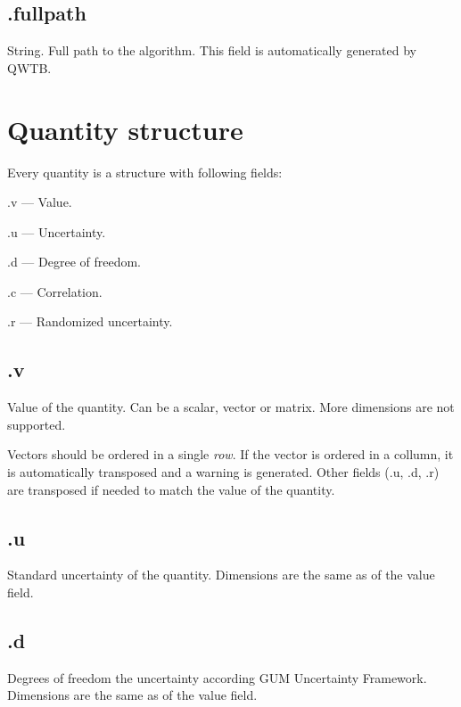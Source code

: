 \documentclass[12pt,a4paper,oneside]{report} %
\begin{document}
\subsection{\textsf{.fullpath}} %
String. Full path to the algorithm. This field is automatically generated by QWTB.

\section{Quantity structure} %
\label{structquantity}
Every quantity is a structure with following fields:
\begin{tightdesc}
        \item [\textsf{.v}] --- Value.
        \item [\textsf{.u}] --- Uncertainty.
        \item [\textsf{.d}] --- Degree of freedom.
        \item [\textsf{.c}] --- Correlation.
        \item [\textsf{.r}] --- Randomized uncertainty.
\end{tightdesc}

\subsection{\textsf{.v}} %
Value of the quantity. Can be a scalar, vector or matrix. More dimensions are not
supported. 

Vectors should be ordered in a single \emph{row}. If the vector is ordered in a collumn,
it is automatically transposed and a warning is generated. Other fields (\textsf{.u},
\textsf{.d}, \textsf{.r}) are transposed if needed to match the value of the quantity.

\subsection{\textsf{.u}} %
Standard uncertainty of the quantity. Dimensions are the same as of the value field.

\subsection{\textsf{.d}} %
Degrees of freedom the uncertainty according GUM Uncertainty Framework. Dimensions are the same as of the value field.
\end{document}
